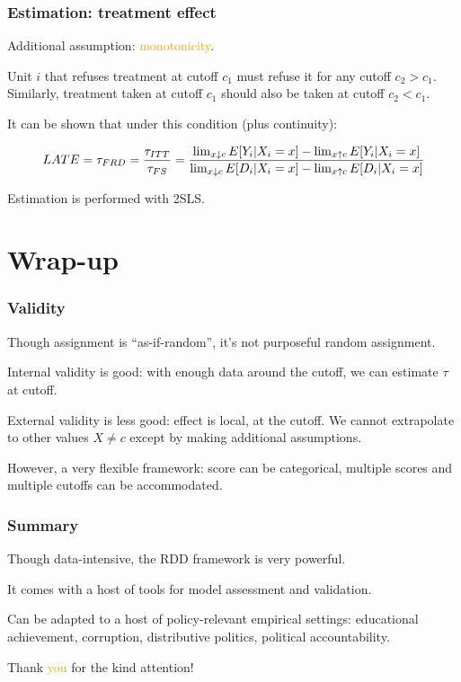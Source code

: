 \documentclass[12pt,english,dvipsnames,aspectratio=169,handout]{beamer}\usepackage[]{graphicx}\usepackage[]{xcolor}
\begin{document}
\begin{frame}
\frametitle{Estimation: treatment effect}
Additional assumption: \textcolor{orange}{monotonicity}.

Unit $i$ that refuses treatment at cutoff $c_1$ must refuse it for any cutoff $c_2 > c_1$. Similarly, treatment taken at cutoff $c_1$ should also be taken at cutoff $c_2 < c_1$.\bigskip
\pause

It can be shown that under this condition (plus continuity):

\begin{equation}
\footnotesize
LATE = \tau_{FRD} = \frac{\tau_{ITT}}{\tau_{FS}} = \frac{\lim_{x \downarrow c}E[Y_i | X_i = x] - \lim_{x \uparrow c}E[Y_i | X_i = x]}{\lim_{x \downarrow c}E[D_i | X_i = x] - \lim_{x \uparrow c}E[D_i | X_i = x]}
\end{equation}

Estimation is performed with 2SLS.
\end{frame}


\section{Wrap-up}

\begin{frame}
\frametitle{Validity}
Though assignment is ``as-if-random'', it's not purposeful random assignment.\bigskip
\pause

Internal validity is good: with enough data around the cutoff, we can estimate $\tau$ at cutoff.\bigskip
\pause

External validity is less good: effect is local, at the cutoff. We cannot extrapolate to other values $X \neq c$ except by making additional assumptions.\bigskip
\pause

However, a very flexible framework: score can be categorical, multiple scores and multiple cutoffs can be accommodated. 
\end{frame}


\begin{frame}
\frametitle{Summary}
Though data-intensive, the RDD framework is very powerful.\bigskip
\pause

It comes with a host of tools for model assessment and validation.\bigskip
\pause

Can be adapted to a host of policy-relevant empirical settings: educational achievement, corruption, distributive politics, political accountability.

\end{frame}


\begin{frame}
\begin{center}
    \Huge Thank \textcolor{orange}{you} for the kind attention!
\end{center}
\end{frame}


\begin{frame}[allowframebreaks]

\scriptsize
\end{frame}
\end{document}

